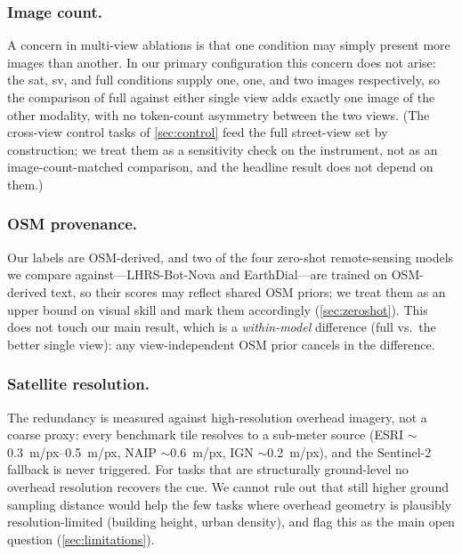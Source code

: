 \subsubsection{Image count.}
A concern in multi-view ablations is that one condition may simply present more
images than another. In our primary configuration this concern does not arise: the
\textsf{sat}, \textsf{sv}, and \textsf{full} conditions supply one, one, and two
images respectively, so the comparison of \textsf{full} against either single view
adds exactly one image of the other modality, with no token-count asymmetry between
the two views. (The cross-view control tasks of \cref{sec:control} feed the full
street-view set by construction; we treat them as a sensitivity check on the
instrument, not as an image-count-matched comparison, and the headline result does
not depend on them.)

\subsubsection{OSM provenance.}
Our labels are OSM-derived, and two of the four zero-shot remote-sensing models we
compare against---LHRS-Bot-Nova and EarthDial---are trained on OSM-derived text, so
their scores may reflect shared OSM priors; we treat them as an upper bound on
visual skill and mark them accordingly (\cref{sec:zeroshot}). This does not touch
our main result, which is a \emph{within-model} difference (\textsf{full} vs.\ the
better single view): any view-independent OSM prior cancels in the difference.

\subsubsection{Satellite resolution.}
The redundancy is measured against high-resolution overhead imagery, not a coarse
proxy: every benchmark tile resolves to a sub-meter source (ESRI
$\sim$\SIrange{0.3}{0.5}{m/px}, NAIP $\sim$\SI{0.6}{m/px}, IGN $\sim$\SI{0.2}{m/px}),
and the Sentinel-2 fallback is never triggered. For tasks that are structurally
ground-level no overhead resolution recovers the cue. We cannot rule out that still
higher ground sampling distance would help the few tasks where overhead geometry is
plausibly resolution-limited (building height, urban density), and flag this as the
main open question (\cref{sec:limitations}).
